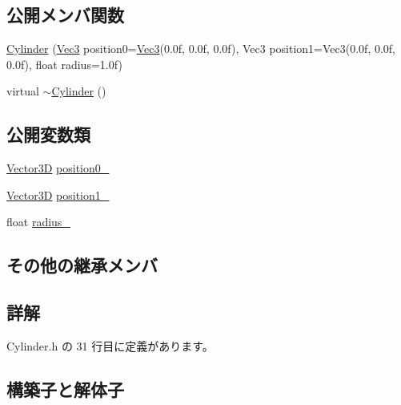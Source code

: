 \subsection*{公開メンバ関数}
\begin{DoxyCompactItemize}
\item 
\mbox{\hyperlink{class_cylinder_a642d2ea21539b8a35ed8c79f36615f6f}{Cylinder}} (\mbox{\hyperlink{_vector3_d_8h_ab16f59e4393f29a01ec8b9bbbabbe65d}{Vec3}} position0=\mbox{\hyperlink{_vector3_d_8h_ab16f59e4393f29a01ec8b9bbbabbe65d}{Vec3}}(0.\+0f, 0.\+0f, 0.\+0f), Vec3 position1=\+Vec3(0.\+0f, 0.\+0f, 0.\+0f), float radius=1.\+0f)
\item 
virtual \mbox{\hyperlink{class_cylinder_a05ab556f0ae3cd6e99d9d1f3caca80b3}{$\sim$\+Cylinder}} ()
\end{DoxyCompactItemize}
\subsection*{公開変数類}
\begin{DoxyCompactItemize}
\item 
\mbox{\hyperlink{class_vector3_d}{Vector3D}} \mbox{\hyperlink{class_cylinder_ade5211259c6543ae77c4707b1ec26538}{position0\+\_\+}}
\item 
\mbox{\hyperlink{class_vector3_d}{Vector3D}} \mbox{\hyperlink{class_cylinder_ada317510ac188ea639a0f8613c2b554e}{position1\+\_\+}}
\item 
float \mbox{\hyperlink{class_cylinder_abba752e07b11b7bfd8fcce64a6d9b678}{radius\+\_\+}}
\end{DoxyCompactItemize}
\subsection*{その他の継承メンバ}


\subsection{詳解}


 Cylinder.\+h の 31 行目に定義があります。



\subsection{構築子と解体子}
\mbox{\label{class_cylinder_a642d2ea21539b8a35ed8c79f36615f6f}} 
